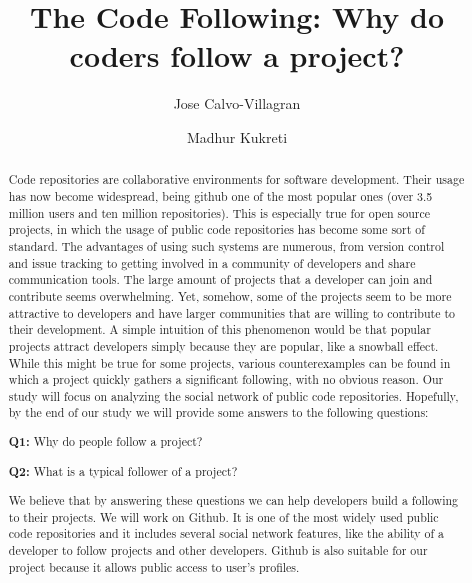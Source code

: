 \documentclass{acm_proc_article-sp}
\begin{document}
\title{The Code Following: Why do coders follow a project?}
\author{
\alignauthor
Jose Calvo-Villagran
\and
\alignauthor
Madhur Kukreti
}

\maketitle

\begin{abstract}
Code  repositories  are  collaborative  environments  for  software development. Their usage has now become widespread, being github one of the most popular ones (over 3.5 million users and ten million repositories). This is especially true for open source projects, in which the usage of public  code  repositories has become some sort  of  standard.  The  advantages of  using  such systems  are  numerous, from version control and issue tracking to getting involved  in  a community of developers and share communication tools. The large amount of projects that a developer can join and contribute seems overwhelming. Yet, somehow,  some  of  the  projects  seem  to  be  more  attractive  to  developers  and  have  larger communities  that  are  willing  to  contribute  to  their  development.  A  simple  intuition  of  this phenomenon would be that popular projects attract developers simply because they are popular, like a snowball effect. While this might be true for some projects, various counterexamples can be found in which  a project quickly gathers a significant following, with no obvious reason. Our study will focus on analyzing the social network of public code repositories. Hopefully, by the end of our study we will provide some answers to the following questions:

\textbf{Q1:} Why do people follow a project?

\textbf{Q2:} What is a typical follower of a project?

We believe that by answering these questions we can help developers build a following to their projects. We will work on Github. It is one of the most widely used public code repositories and it includes several  social  network  features,  like  the  ability  of  a  developer  to  follow  projects  and  other developers.  Github  is  also  suitable  for  our  project  because  it  allows  public access to user's profiles.\cite{abramowitz+stegun}
\end{abstract}













\end{document}

